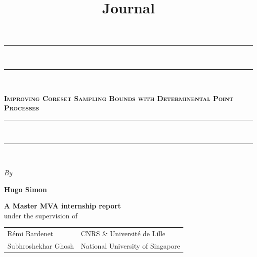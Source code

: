 \documentclass[12pt, a4paper]{report}
\title{Journal}
\newcommand{\authorName}{Hugo Simon}
\newcommand{\supervisor}{R\'emi Bardenet}
\newcommand{\cosupervisor}{Subhroshekhar Ghosh}
\newcommand{\1}{\mathds{1}} %
\theoremstyle{definition} %
\begin{document}
	
\begin{titlepage}
\begin{center}

		

	\vspace*{25pt} {
	\begin{spacing}{0.05}
		\rule{400pt}{2pt}\\
		\rule{400pt}{0.75pt}\\
	\end{spacing}
	\vspace{20pt}
	\begin{spacing}{0.9}
		\fontsize{26pt}{26pt}\selectfont%
		\textsc{\textbf{Improving Coreset Sampling Bounds with Determinental Point Processes}}\\%
	\end{spacing}
	\vspace{5pt}
	\begin{spacing}{0.05}
		\rule{400pt}{0.75pt}\\
		\rule{400pt}{2pt}\\
	\end{spacing}
	}

	\vspace*{1cm}
	\begin{large}
	\textit{By}\\%
	\end{large}


	\vspace*{4pt}
	\begin{Large}
	\textbf{\authorName}\\%
	\end{Large}

	\begin{large}
	\vspace*{6cm}
	\textbf{
	A Master MVA internship report }
	\vspace*{6pt}\\
	under the supervision of
	\vspace*{20pt}\\

	\begin{longtable*}{ p{0.4\textwidth} p{0.5\textwidth} }
		\supervisor & CNRS \& Université de Lille
		\tabularnewline\cosupervisor & National University of Singapore
		\tabularnewline
	\end{longtable*}
\end{large}


	\vspace*{2cm}



\end{center}
\end{titlepage}
\end{document}
